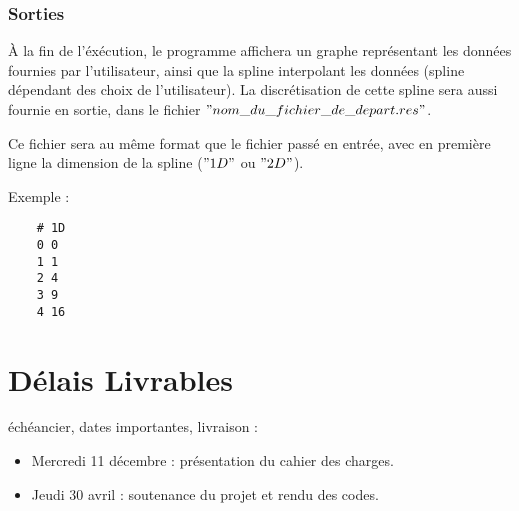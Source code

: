 \documentclass[a4paper,12pt]{article}
\begin{document}
\subsubsection{Sorties}

À la fin de l'éxécution, le programme affichera un graphe représentant les données fournies par l'utilisateur, ainsi que la spline interpolant les données (spline dépendant des choix de l'utilisateur). La discrétisation de cette spline sera aussi fournie en sortie, dans le fichier $"nom\_du\_fichier\_de\_depart.res"$.

Ce fichier sera au même format que le fichier passé en entrée, avec en première ligne la dimension de la spline ($"1D" $ ou $"2D"$).

Exemple : 

\begin{lstlisting}
    # 1D
    0 0
    1 1
    2 4
    3 9
    4 16
\end{lstlisting}

\section{Délais Livrables}

échéancier, dates importantes, livraison :
\begin{itemize}
\item Mercredi 11 décembre : présentation du cahier des charges.
\item Jeudi 30 avril : soutenance du projet et rendu des codes.
\end{itemize}
\end{document}
